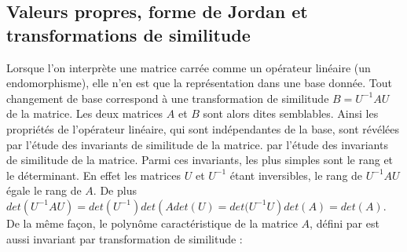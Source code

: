 \subsection{Valeurs propres, forme de Jordan et transformations de similitude}
Lorsque l’on interprète une matrice carrée comme un opérateur linéaire (un endomorphisme), elle n’en est que la représentation dans une base donnée. Tout changement de base correspond à une transformation de similitude 
$B = U^{-1}AU$ de la matrice. Les deux matrices $A$ et $B$ sont alors dites semblables. Ainsi les propriétés de l’opérateur linéaire, qui sont indépendantes de la base, sont révélées par l’étude des invariants de similitude de la matrice.
par l’étude des invariants de similitude de la matrice. Parmi ces invariants, les plus simples sont le rang et le déterminant. En effet les matrices $U$ et $U^{-1}$ étant inversibles, le rang de $U^{-1}AU$ égale le rang de $A$. De plus $det\left( U^{-1}AU\right)  = det\left( U^{-1}\right) det \left(A det(U) = det(U^{-1}U\right) det\left( A\right) = det\left(A\right)$. De
la même façon, le polynôme caractéristique de la matrice $A$, défini par 
 est aussi invariant par transformation de similitude :
%


